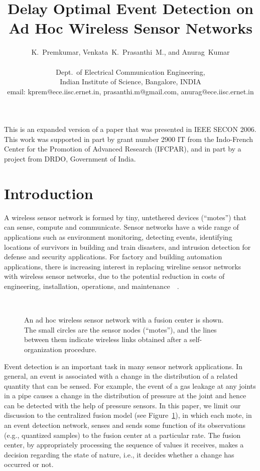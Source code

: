 \documentclass[acmtosn]{acmtrans2m}
\title{Delay Optimal Event Detection on Ad Hoc Wireless Sensor
Networks}
\author{K.~Premkumar, Venkata~K.~Prasanthi~M., and Anurag~Kumar\\ \\
        Dept.\ of Electrical Communication Engineering,\\ 
        Indian Institute of Science, Bangalore, INDIA\\ 
        email: kprem@ece.iisc.ernet.in,
               prasanthi.m@gmail.com, 
               anurag@ece.iisc.ernet.in}
\begin{document}
\setcounter{page}{1}

\begin{bottomstuff}
This is an expanded version of a paper that was presented in IEEE
SECON 2006. This work was supported in part by grant number 2900 
IT from the Indo-French Center for the Promotion of Advanced Research 
(IFCPAR), and in part by a project from DRDO, Government of India.
\end{bottomstuff}

\maketitle

\section{Introduction}
\label{sec:introduction}

A wireless sensor network is formed by tiny, untethered devices
(``motes'') that can sense, compute and communicate. Sensor networks 
have a wide range of applications such as environment monitoring, 
detecting events, identifying locations of survivors in building 
and train disasters, and intrusion detection for defense and security 
applications. For factory and building automation applications, there 
is increasing interest in replacing wireline sensor networks with 
wireless sensor networks, due to the potential reduction in costs 
of engineering, installation, operations, and 
maintenance~\cite{honeywell-site}~\cite{isa-site}.

\begin{figure}[t]
   \centering \
    \caption{An ad hoc wireless sensor network with a fusion center is
     shown. The small circles are the sensor nodes (``motes''), and the
     lines between them indicate wireless links obtained after a
     self-organization procedure.}
   \label{fig:wsn_mesh}
\end{figure}

Event detection is an important task in many sensor network
applications. In general, an event is associated with a change in the
distribution of a related quantity that can be sensed. For example, the
event of a gas leakage at any joints in a pipe causes a change in the
distribution of pressure at the joint and hence can be detected with the
help of pressure sensors. In this paper, we limit our discussion to the
centralized fusion model (see Figure~\ref{fig:wsn_mesh}), in which each
mote, in an event detection network, senses and sends some function of
its observations (e.g., quantized samples) to the fusion center at a
particular rate. The fusion center, by appropriately processing the
sequence of values it receives, makes a decision regarding the state of
nature, i.e., it decides whether a change has occurred or not.
\end{document}
